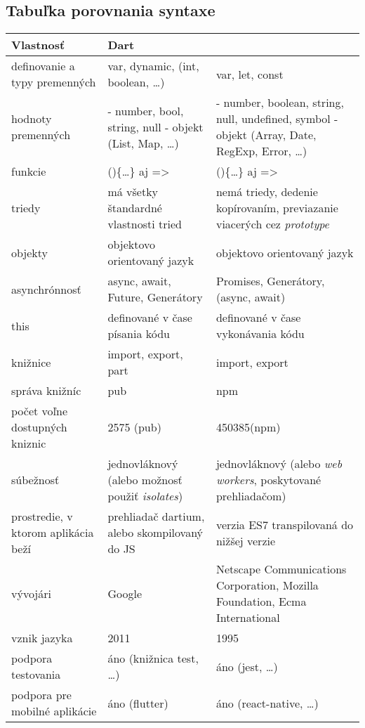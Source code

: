 \subsection{Tabuľka porovnania syntaxe}
\label{tab:compare}

\begin{tabular}{| p{4cm} | p{5cm} | p{5cm} |}
 \hline         %
   Vlastnosť & Dart & \JS{} \\ %
  \hline
  \hline
   definovanie a typy premenných & 
   var, dynamic,  (int, boolean, \ldots)& %
   var, let, const \\
  \hline
   hodnoty premenných & 
   - number, bool, string, null \newline
   - objekt (List, Map, \ldots)
    & 
   - number, boolean, string, null, undefined, symbol \newline
   - objekt (Array, Date, RegExp, Error, \ldots)
    \\
  \hline
   funkcie & 
   ()\{\ldots\} aj => & 
   ()\{\ldots\} aj => \\
  \hline
   triedy & 
   má všetky štandardné vlastnosti tried & 
   nemá triedy, dedenie kopírovaním, previazanie viacerých cez \emph{prototype} \\
  \hline
   objekty & 
   objektovo orientovaný jazyk & 
   objektovo orientovaný jazyk \\
  \hline
   asynchrónnosť &
   async, await, Future, Generátory & 
   Promises, Generátory, (async, await) \\
  \hline
   this & 
   definované v čase písania kódu & 
   definované v čase vykonávania kódu \\
  \hline
   knižnice & 
   import, export, part & 
   import, export \\
  \hline
   správa knižníc & 
   pub & 
   npm \\
  \hline
   počet voľne dostupných kniznic & 
   2575 (pub) & 
   450385\footnotemark (npm) \\
  \hline
   súbežnosť & 
   jednovláknový (alebo možnosť použiť \emph{isolates}) & 
   jednovláknový (alebo \emph{web workers}, poskytované prehliadačom) \\
  \hline
   prostredie, v ktorom aplikácia beží & 
   prehliadač dartium, alebo skompilovaný do JS & 
   verzia ES7 transpilovaná do nižšej verzie \\
  \hline
   vývojári & 
   Google & 
   Netscape Communications Corporation, Mozilla Foundation, Ecma International \\
  \hline
   vznik jazyka & 
   2011 & 
   1995 \\
  \hline
   podpora testovania & 
   áno (knižnica test, \ldots) & 
   áno (jest, \ldots) \\
  \hline
  podpora pre mobilné aplikácie & 
  áno (flutter) & 
  áno (react-native, \ldots) \\
  \hline
 \end{tabular}
